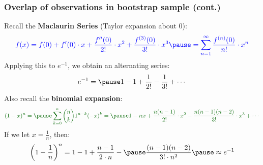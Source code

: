 \documentclass[smaller]{beamer}
\newcommand{\lt}{\left}
\newcommand{\rt}{\right}
\newcommand{\?}{\stackrel{?}{=}}
\newcommand{\fr}{\frac}
\newcommand{\bl}{\color{blue}}
\newcommand{\gr}{\color{green!40!black}}
\begin{document}
\begin{frame}
  \frametitle{Overlap of observations in bootstrap sample (cont.)}
  \pause

  Recall the \textbf{\bl Maclaurin Series} (Taylor expansion about 0):\pause
  \begin{equation}\bl
    f(x) = f(0) + f'(0)\cdot x +\fr{ f''(0)}{2!}\cdot  x^2 + \fr{ f^{(3)}(0)}{3!}\cdot  x^3 \pause =
    \sum_{n=1}^\infty \fr{ f^{(n)}(0)}{n!} \cdot x^n
  \end{equation}
  \pause
  Applying this to $e^{-1}$, we obtain an alternating series:\pause
  \begin{equation}
    e^{-1} = \pause 1 - 1 + \fr{1}{2!} - \fr{1}{3!} + \cdots
  \end{equation}
  \pause
  Also recall the \textbf{\gr binomial expansion}:\pause
  \begin{equation}\gr
    (1-x)^n = \pause \sum_{k=0}^n {n \choose k}1^{n-k}(-x)^k = \pause
    1 - nx + \fr{n(n-1)}{2!}\cdot x^2 - \fr{n(n-1)(n-2)}{3!}\cdot x^3 + \cdots
  \end{equation}
  \pause
  If we let $x = \fr 1n$, then:\pause
  \begin{equation}
    \lt(1-\fr1n\rt)^n = 1 - 1 + \fr{n-1}{2 \cdot n} -\pause \fr{(n-1)(n-2)}{3!\cdot n^2} \pause \approx e^{-1}
  \end{equation}

\end{frame}
\end{document}

